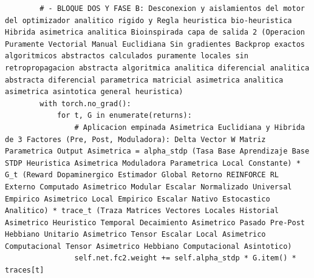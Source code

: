 \documentclass[a4paper,12pt,twocolumn]{article}
\begin{document}
\begin{lstlisting}
        # - BLOQUE DOS Y FASE B: Desconexion y aislamientos del motor del optimizador analitico rigido y Regla heuristica bio-heuristica Hibrida asimetrica analitica Bioinspirada capa de salida 2 (Operacion Puramente Vectorial Manual Euclidiana Sin gradientes Backprop exactos algoritmicos abstractos calculados puramente locales sin retropropagacion abstracta algoritmica analitica diferencial analitica abstracta diferencial parametrica matricial asimetrica analitica asimetrica asintotica general heuristica)
        with torch.no_grad():
            for t, G in enumerate(returns):
                # Aplicacion empinada Asimetrica Euclidiana y Hibrida de 3 Factores (Pre, Post, Moduladora): Delta Vector W Matriz Parametrica Output Asimetrica = alpha_stdp (Tasa Base Aprendizaje Base STDP Heuristica Asimetrica Moduladora Parametrica Local Constante) * G_t (Reward Dopaminergico Estimador Global Retorno REINFORCE RL Externo Computado Asimetrico Modular Escalar Normalizado Universal Empirico Asimetrico Local Empirico Escalar Nativo Estocastico Analitico) * trace_t (Traza Matrices Vectores Locales Historial Asimetrico Heuristico Temporal Decaimiento Asimetrico Pasado Pre-Post Hebbiano Unitario Asimetrico Tensor Escalar Local Asimetrico Computacional Tensor Asimetrico Hebbiano Computacional Asintotico)
                self.net.fc2.weight += self.alpha_stdp * G.item() * traces[t]
\end{lstlisting}
\end{document}
